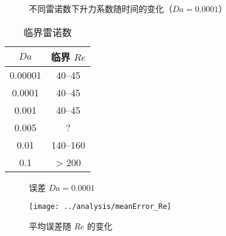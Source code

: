 \begin{figure}
	\setlength{\subfigcapskip}{-1bp}
	\centering
	\begin{minipage}{\textwidth}
		\centering
	\end{minipage}
	\centering
	\begin{minipage}{\textwidth}
		\centering
	\end{minipage}
	\vspace{0.2em}
	\caption{不同雷诺数下升力系数随时间的变化（$Da=0.0001$）}
	\label{fig: Cl_t}
\end{figure}

\begin{table}
	\caption{临界雷诺数}\label{tab: critical Re}
	\vspace{.5em}\centering\wuhao
	\begin{tabular}{cc}
		\toprule[1.5pt]
		$Da$ & 临界 $Re$ \\
		\midrule[1pt]
		0.00001 & 40--45 \\
		0.0001  & 40--45 \\
		0.001   & 40--45 \\
		0.005   & ? \\
		0.01    & 140--160 \\
		0.1     & > 200 \\
	\bottomrule[1.5pt]
	\end{tabular}
\end{table}

\begin{figure}
	\centering
	\begin{minipage}{\textwidth}
		\centering
	\end{minipage}
	\centering
	\begin{minipage}{\textwidth}
		\centering
	\end{minipage}
	\caption{误差 $Da=0.0001$}
	\label{fig: resd}
\end{figure}

\begin{figure}
	\centering
	\texttt{[image: ../analysis/meanError\_Re]}
	\caption{平均误差随 $Re$ 的变化}
	\label{fig: error}
\end{figure}


